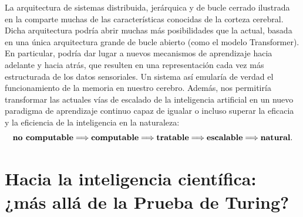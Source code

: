 \documentclass[../../book-main_es.tex]{subfiles}
\begin{document}
La arquitectura de sistemas distribuida, jerárquica y de bucle cerrado ilustrada en 
la  comparte muchas de las características conocidas de la corteza cerebral. Dicha 
arquitectura podría abrir muchas más posibilidades que la actual, basada en una única arquitectura 
grande de bucle abierto (como el modelo Transformer). En particular, podría dar lugar a nuevos mecanismos de 
aprendizaje hacia adelante y hacia atrás, que resulten en una representación cada 
vez más estructurada de los datos sensoriales. Un sistema así 
emularía de verdad el funcionamiento de la memoria en nuestro cerebro. Además, nos permitiría 
transformar las actuales vías de escalado de la inteligencia artificial en un nuevo paradigma 
de aprendizaje continuo capaz de igualar o incluso superar la eficacia y la eficiencia de la 
inteligencia en la naturaleza:
\begin{equation}
    \text{\textbf{no computable}}
    \Longrightarrow \text{\textbf{computable}}
    \Longrightarrow \text{\textbf{tratable}} \Longrightarrow
    \text{\textbf{escalable}}
    \Longrightarrow
    \text{\textbf{natural}}.
\end{equation}

\section{Hacia la inteligencia científica: ¿más allá de la Prueba de Turing?}
\end{document}

